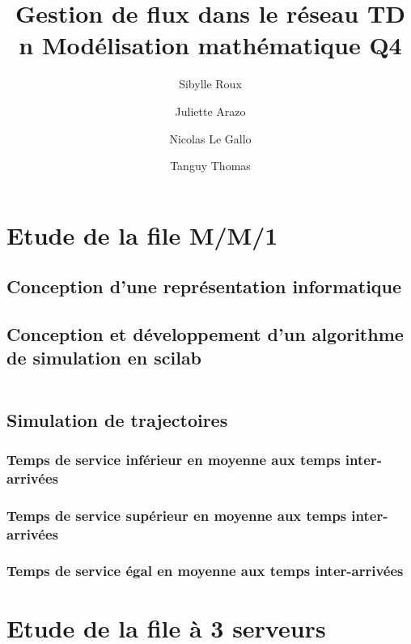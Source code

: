 \documentclass{article}
\begin{document}
\title{Gestion de flux dans le réseau
	\smallbreak
	TD n
	\smallbreak
	Modélisation mathématique
	\smallbreak
	Q4}
\author{Sibylle Roux \and Juliette Arazo \and Nicolas Le Gallo \and Tanguy Thomas}

\maketitle

\newpage

\tableofcontents

\newpage

\section{Etude de la file M/M/1}

\subsection{Conception d'une représentation informatique}

\subsection{Conception et développement d'un algorithme de simulation en scilab}
\begin{verbatim}
\end{verbatim}

\subsection{Simulation de trajectoires}

\subsubsection{Temps de service inférieur en moyenne aux temps inter-arrivées}
\subsubsection{Temps de service supérieur en moyenne aux temps inter-arrivées}
\subsubsection{Temps de service égal en moyenne aux temps inter-arrivées}

\section{Etude de la file à 3 serveurs}
\end{document}
